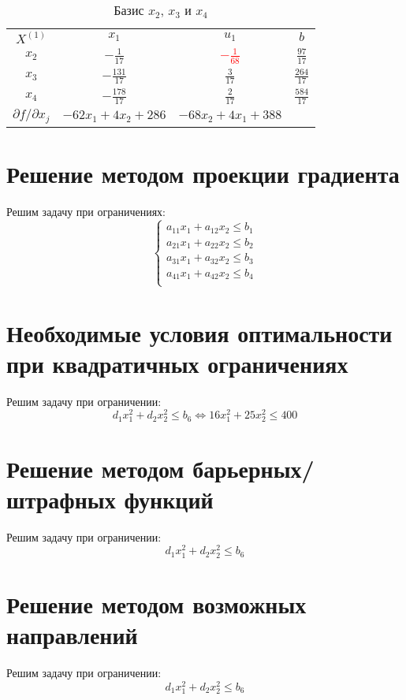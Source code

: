 \begin{table}[H]
\begin{center}
	\def\tabcolsep{15pt}
	\def\arraystretch{1.3}
	\caption{Базис $x_2$, $x_3$ и $x_4$}
	\label{tab:simplex_1}
	\begin{tabular}{|c||c|c||c|}
		\hline
		$X^{(1)}$ & $x_1$ & $u_1$ & $b$ \\ 
		\hhline{|=#==#=|}
		$x_2$ & $-\frac{1}{17}$ & \textcolor{red}{\boldmath$-\frac{1}{68}$} & $\frac{97}{17}$ \\ 
		\hline
		$x_3$ & $-\frac{131}{17}$ & $\frac{3}{17}$ & $\frac{264}{17}$ \\ 
		\hline
		$x_4$ & $-\frac{178}{17}$ & $\frac{2}{17}$ & $\frac{584}{17}$ \\ 
		\hhline{|=#==#=|}
		$\partial f / \partial x_j$ & $-62 x_1 + 4 x_2 + 286$ & $-68 x_2 + 4 x_1 + 388$ &  \\ 
		\hline
	\end{tabular}
\end{center}
\end{table}

\section{Решение методом проекции градиента}

Решим задачу при ограничениях:
\begin{equation*}
\begin{cases}
a_{11} x_1 + a_{12} x_2 \leq b_1 \\
a_{21} x_1 + a_{22} x_2 \leq b_2 \\
a_{31} x_1 + a_{32} x_2 \leq b_3 \\
a_{41} x_1 + a_{42} x_2 \leq b_4 \\
\end{cases}
\end{equation*}

\section{Необходимые условия оптимальности при квадратичных ограничениях}

Решим задачу при ограничении:
\begin{equation*}
d_1 x_1^2 + d_2 x_2^2 \leq b_6
\Longleftrightarrow
16 x_1^2 + 25 x_2^2 \leq 400
\end{equation*}

\section{Решение методом барьерных/штрафных функций}

Решим задачу при ограничении:
\begin{equation*}
d_1 x_1^2 + d_2 x_2^2 \leq b_6
\end{equation*}

\section{Решение методом возможных направлений}

Решим задачу при ограничении:
\begin{equation*}
d_1 x_1^2 + d_2 x_2^2 \leq b_6
\end{equation*}

